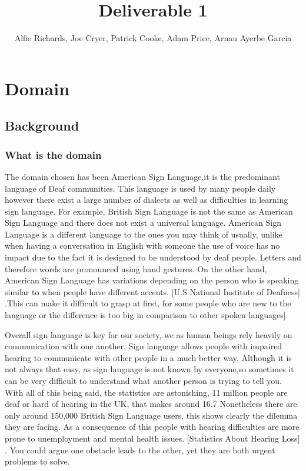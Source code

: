 \documentclass[10pt]{article}
\title{Deliverable 1}
\author{Alfie Richards, Joe Cryer, Patrick Cooke, Adam Price, Arnau Ayerbe Garcia}
\begin{document}
  \maketitle
  \tableofcontents

  \section{Domain}
  \subsection{Background}
  \subsubsection{What is the domain}
  The domain chosen has been American Sign Language,it is the predominant language of Deaf 
  communities. This language is used by many people daily however there exist a large number of 
  dialects as well as difficulties in learning sign language. For example, British Sign Language is 
  not the same as American Sign Language and there does not exist a universal language. American 
  Sign Language is a different language to the ones you may think of usually, unlike when having a 
  conversation in English with someone the use of voice has no impact due to the fact it is designed 
  to be understood by deaf people. Letters and therefore words are pronounced using hand gestures. 
  On the other hand, American Sign Language has variations depending on the person who is speaking 
  similar to when people have different accents. [U.S National Institute of Deafness] .This can make 
  it difficult to grasp at first, for some people who are new to the language or the difference is 
  too big in comparison to other spoken languages]. 

  Overall sign language is key for our society, we as human beings rely heavily on communication 
  with one another. Sign language allows people with impaired hearing to communicate with other 
  people in a much better way. Although it is not always that easy, as sign language is not known by 
  everyone,so sometimes it can be very difficult to understand what another person is trying to tell 
  you. With all of this being said, the statistics are astonishing, 11 million people are deaf or 
  hard of hearing in the UK, that makes around 16.7%
  Nonetheless there are only around 150,000 British Sign Language users, this shows clearly the 
  dilemma they are facing. As a consequence of this people with hearing difficulties are more prone 
  to unemployment and mental health issues. [Statistics About Hearing Loss] . You could argue one 
  obstacle leads to the other, yet they are both urgent problems to solve.
\end{document}
